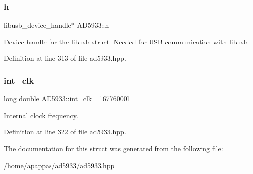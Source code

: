 \subsubsection{\texorpdfstring{h}{h}}
{\footnotesize\ttfamily libusb\+\_\+device\+\_\+handle$\ast$ A\+D5933\+::h}



Device handle for the libusb struct. Needed for U\+SB communication with libusb. 



Definition at line 313 of file ad5933.\+hpp.

\mbox{\label{struct_a_d5933_ad02bf6e28b287b4d1cc29804abf5d61b}} 
\subsubsection{\texorpdfstring{int\+\_\+clk}{int\_clk}}
{\footnotesize\ttfamily long double A\+D5933\+::int\+\_\+clk =16776000l}



Internal clock frequency. 



Definition at line 322 of file ad5933.\+hpp.



The documentation for this struct was generated from the following file\+:\begin{DoxyCompactItemize}
\item 
/home/apappas/ad5933/\mbox{\hyperlink{ad5933_8hpp}{ad5933.\+hpp}}\end{DoxyCompactItemize}
